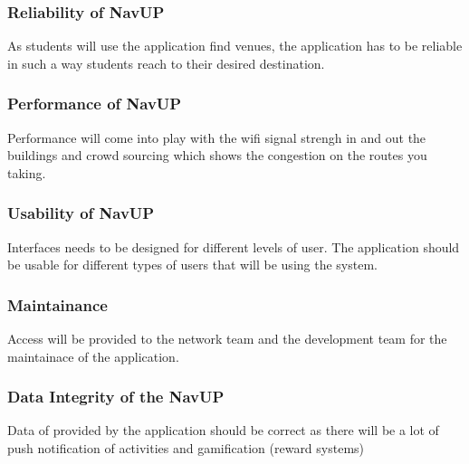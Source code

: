 \documentclass{article}
\begin{document}
\subsubsection{Reliability of NavUP}
As students will use the application find venues, the application has to be reliable in such a way students reach to their desired destination.
\subsubsection{Performance of NavUP}
Performance will come into play with the wifi signal strengh in and out the buildings and crowd sourcing which shows the congestion on the routes you taking.
\subsubsection{Usability of NavUP}
Interfaces needs to be designed for different levels of user. The application should be usable for different types of users that will be using the system.
\subsubsection{Maintainance}
Access will be provided to the network team and the development team for the maintainace of the application.
\subsubsection{Data Integrity of the NavUP}
Data of provided by the application should be correct as there will be a lot of push notification of activities and gamification (reward systems)

\newpage
\centering
\end{document}
